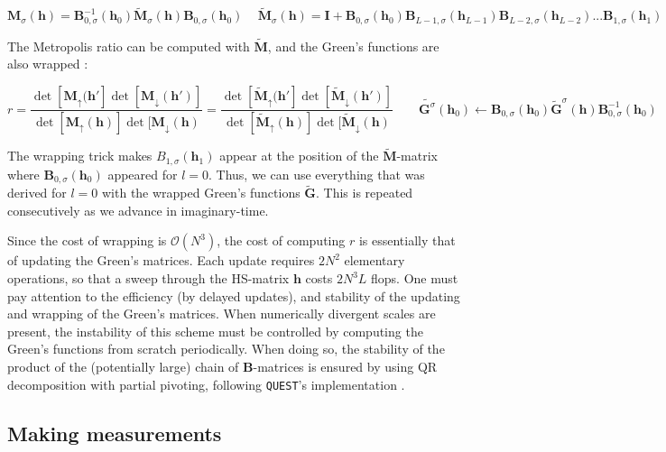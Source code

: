 \begin{equation}
\bm M_\sigma ( \bm h ) = \bm B_{0, \sigma}^{-1} ( \bm h_0 ) \widetilde{\bm M}_\sigma (\bm h) \bm B_{0, \sigma} ( \bm h_0 )  \, \quad \widetilde{\bm M}_\sigma (\bm h) = \bm I + \bm B_{0, \sigma} ( \bm h_0 ) \bm B_{L-1, \sigma} ( \bm h_{L-1} ) \bm B_{L-2, \sigma} ( \bm h_{L-2} ) ... \bm B_{1, \sigma} ( \bm h_1 )
\end{equation}

The Metropolis ratio can be computed with $\widetilde{\bm M}$, and the Green's functions are also wrapped :

\begin{equation}
r = \frac{\det[\bm M_\uparrow (\bm h'] \det[\bm M_\downarrow ( \bm h')]}{\det[\bm M_\uparrow (\bm h)] \det[\bm M_\downarrow ( \bm h)} = \frac{\det[\widetilde{\bm M}_\uparrow (\bm h'] \det[\widetilde{\bm M}_\downarrow ( \bm h')]}{\det[\widetilde{\bm M}_\uparrow (\bm h)] \det[\widetilde{\bm M}_\downarrow ( \bm h)} 
\quad\quad
\widetilde{\bm G^\sigma} ( \bm h_0) \leftarrow \bm B_{0, \sigma}( \bm h_0 ) \widetilde{\bm G}^\sigma (\bm h) \bm B_{0, \sigma}^{-1}  ( \bm h_0 )
\end{equation}

The wrapping trick makes $B_{1, \sigma} ( \bm h_1)$ appear at the position of the $\widetilde{\bm M}$-matrix where $\bm B_{0, \sigma} ( \bm h_0)$ appeared for $l = 0$.
Thus, we can use everything that was derived for $l = 0$ with the wrapped Green's functions $\widetilde{\bm G}$.
This is repeated consecutively as we advance in imaginary-time.

Since the cost of wrapping is $\mathcal{O}(N^3)$, the cost of computing $r$ is essentially that of updating the Green's matrices.
Each update requires $2N^2$ elementary operations, so that a sweep through the HS-matrix $\bm h$ costs $2 N^3 L$ flops.
One must pay attention to the efficiency (by delayed updates), and stability of the updating and wrapping of the Green's matrices.
When numerically divergent scales are present, the instability of this scheme must be controlled by computing the Green's functions from scratch periodically.
When doing so, the stability of the product of the (potentially large) chain of $\bm B$-matrices is ensured by using QR decomposition with partial pivoting, following \texttt{QUEST}'s implementation \cite{hou_numerical_2009}.

\subsection{Making measurements}

